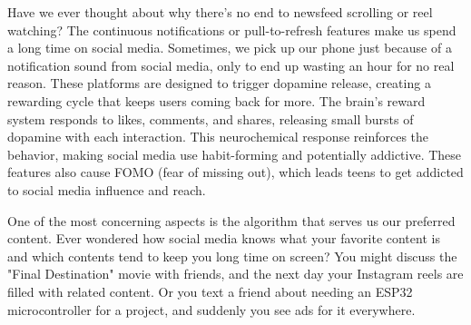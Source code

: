 \documentclass[a4paper,10pt,twocolumn]{memoir}
\begin{document}
{{{{{{

Have we ever thought about why there’s no end to newsfeed scrolling or reel watching? The continuous notifications or pull-to-refresh features make us spend a long time on social media. Sometimes, we pick up our phone just because of a notification sound from social media, only to end up wasting an hour for no real reason. These platforms are designed to trigger dopamine release, creating a rewarding cycle that keeps users coming back for more. The brain’s reward system responds to likes, comments, and shares, releasing small bursts of dopamine with each interaction. This neurochemical response reinforces the behavior, making social media use habit-forming and potentially addictive. These features also cause FOMO (fear of missing out), which leads teens to get addicted to social media influence and reach.

One of the most concerning aspects is the algorithm that serves us our preferred content. Ever wondered how social media knows what your favorite content is and which contents tend to keep you long time on screen? You might discuss the "Final Destination" movie with friends, and the next day your Instagram reels are filled with related content. Or you text a friend about needing an ESP32 microcontroller for a project, and suddenly you see ads for it everywhere.

}}}}}}
\end{document}
